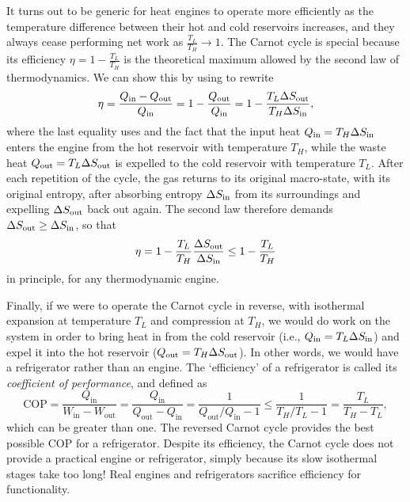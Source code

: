 It turns out to be generic for heat engines to operate more efficiently as the temperature difference between their hot and cold reservoirs increases, and they always cease performing net work as $\frac{T_L}{T_H} \to 1$.
The Carnot cycle is special because its efficiency $\eta = 1 - \frac{T_L}{T_H}$ is the theoretical maximum allowed by the second law of thermodynamics.
We can show this by using  to rewrite
\begin{equation*}
  \eta = \frac{Q_{\text{in}} - Q_{\text{out}}}{Q_{\text{in}}} = 1 - \frac{Q_{\text{out}}}{Q_{\text{in}}} = 1 - \frac{T_L \Delta S_{\text{out}}}{T_H \Delta S_{\text{in}}},
\end{equation*}
where the last equality uses  and the fact that the input heat $Q_{\text{in}} = T_H \Delta S_{\text{in}}$ enters the engine from the hot reservoir with temperature $T_H$, while the waste heat $Q_{\text{out}} = T_L \Delta S_{\text{out}}$ is expelled to the cold reservoir with temperature $T_L$.
After each repetition of the cycle, the gas returns to its original macro-state, with its original entropy, after absorbing entropy $\Delta S_{\text{in}}$ from its surroundings and expelling $\Delta S_{\text{out}}$ back out again.
The second law therefore demands $\Delta S_{\text{out}} \geq \Delta S_{\text{in}}$, so that
\begin{equation*}
  \eta = 1 - \frac{T_L}{T_H} \frac{\Delta S_{\text{out}}}{\Delta S_{\text{in}}} \leq 1 - \frac{T_L}{T_H}
\end{equation*}
in principle, for any thermodynamic engine. %

Finally, if we were to operate the Carnot cycle in reverse, with isothermal expansion at temperature $T_L$ and compression at $T_H$, we would do work on the system in order to bring heat in from the cold reservoir (i.e., $Q_{\text{in}} = T_L \Delta S_{\text{in}}$) and expel it into the hot reservoir ($Q_{\text{out}} = T_H \Delta S_{\text{out}}$).
In other words, we would have a refrigerator rather than an engine.
The `efficiency' of a refrigerator is called its \textit{coefficient of performance}, and defined as
\begin{equation*}
  \mathrm{COP} = \frac{Q_{\text{in}}}{W_{\text{in}} - W_{\text{out}}} = \frac{Q_{\text{in}}}{Q_{\text{out}} - Q_{\text{in}}} = \frac{1}{Q_{\text{out}} / Q_{\text{in}} - 1} \leq \frac{1}{T_H / T_L - 1} = \frac{T_L}{T_H - T_L},
\end{equation*}
which can be greater than one.
The reversed Carnot cycle provides the best possible $\mathrm{COP}$ for a refrigerator.
Despite its efficiency, the Carnot cycle does not provide a practical engine or refrigerator, simply because its slow isothermal stages take too long!
Real engines and refrigerators sacrifice efficiency for functionality.
